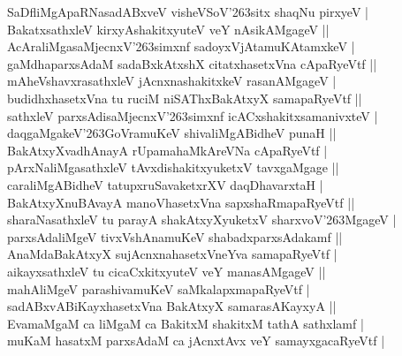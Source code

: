 \begin{entry}
\smallskip
\begin{shl}
SaDfliMgApaRNasadABxveV visheVSoV{\char'263}sitx shaqNu pirxyeV |\\[2pt]
BakatxsathxleV kirxyAshakitxyuteV veY nAsikAMgageV ||\\[3pt]
AcAraliMgasaMjecnxV{\char'263}simxnf sadoyxVjAtamuKAtamxkeV |\\[2pt]
gaMdhaparxsAdaM sadaBxkAtxshX citatxhasetxVna cApaRyeVtf ||\\[2pt]
mAheVshavxrasathxleV jAcnxnashakitxkeV rasanAMgageV |\\[3pt]
budidhxhasetxVna tu ruciM niSAThxBakAtxyX samapaRyeVtf ||\\[2pt]
sathxleV parxsAdisaMjecnxV{\char'263}simxnf icACxshakitxsamanivxteV |\\[2pt]
daqgaMgakeV{\char'263}GoVramuKeV shivaliMgABidheV punaH ||\\[2pt]
BakAtxyXvadhAnayA rUpamahaMkAreVNa cApaRyeVtf |\\[2pt]
pArxNaliMgasathxleV tAvxdishakitxyuketxV tavxgaMgage ||\\[2pt]
caraliMgABidheV tatupxruSavaketxrXV daqDhavarxtaH |\\[2pt]
BakAtxyXnuBAvayA manoVhasetxVna sapxshaRmapaRyeVtf ||\\[2pt]
sharaNasathxleV tu parayA shakAtxyXyuketxV sharxvoV{\char'263}MgageV |\\[2pt]
parxsAdaliMgeV tivxVshAnamuKeV shabadxparxsAdakamf ||\\[2pt]
AnaMdaBakAtxyX sujAcnxnahasetxVneYva samapaRyeVtf |\\[2pt]
aikayxsathxleV tu cicaCxkitxyuteV veY manasAMgageV ||\\[2pt]
mahAliMgeV parashivamuKeV saMkalapxmapaRyeVtf |\\[2pt]
sadABxvABiKayxhasetxVna BakAtxyX samarasAKayxyA ||\\[2pt]
EvamaMgaM ca liMgaM ca BakitxM shakitxM tathA sathxlamf |\\[2pt]
muKaM hasatxM parxsAdaM ca jAcnxtAvx veY samayxgacaRyeVtf |\\[2pt]

\end{shl}
\end{entry}
